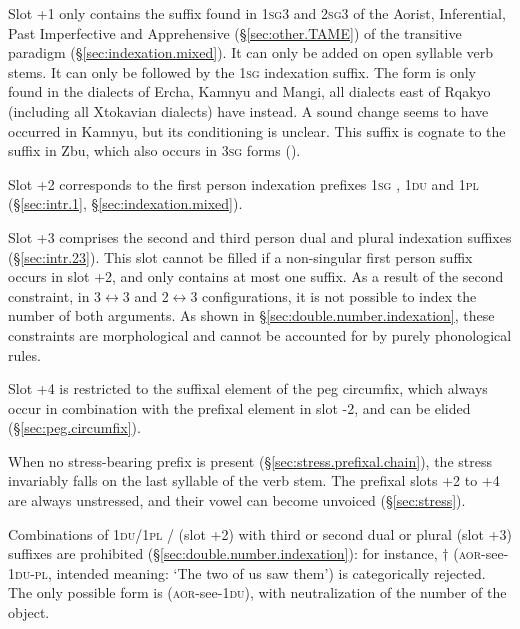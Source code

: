Slot +1 only contains the  suffix found in  \textsc{1sg}\fl{}3 and \textsc{2sg}\fl{}3 of the Aorist, Inferential, Past Imperfective and Apprehensive (§\ref{sec:other.TAME}) of the transitive paradigm (§\ref{sec:indexation.mixed}). It can only be added on open syllable verb stems. It can only be followed by the \textsc{1sg}  indexation suffix. The form  is only found in the dialects of Ercha, Kamnyu and Mangi, all dialects east of Rqakyo (including all Xtokavian dialects) have  instead. A sound change  \fl{}  seems to have occurred in Kamnyu, but its conditioning is unclear. This suffix is cognate to the suffix  in Zbu, which also occurs in \textsc{3sg}\flobv{} forms (\citealt[160--161]{gong18these}).

Slot +2 corresponds to the first person indexation prefixes \textsc{1sg} , \textsc{1du}  and \textsc{1pl}  (§\ref{sec:intr.1},  §\ref{sec:indexation.mixed}).

Slot +3 comprises the second and third person dual  and plural  indexation suffixes (§\ref{sec:intr.23}). This slot cannot be filled if a non-singular first person suffix occurs in slot +2, and only contains at most one suffix. As a result of the second constraint, in 3$\leftrightarrow$3 and 2$\leftrightarrow$3 configurations, it is not possible to index the number of both arguments. As shown in §\ref{sec:double.number.indexation}, these constraints are morphological and cannot be accounted for by purely phonological rules.

Slot +4 is restricted to the suffixal element  of the peg circumfix, which always occur in combination with the prefixal element  in slot -2, and can be elided (§\ref{sec:peg.circumfix}).

When no stress-bearing prefix is present (§\ref{sec:stress.prefixal.chain}), the stress invariably falls on the last syllable of the verb stem. The prefixal slots +2 to +4 are always unstressed, and their vowel can become unvoiced (§\ref{sec:stress}).

Combinations of \textsc{1du}/\textsc{1pl} / (slot +2) with third or second dual or plural  (slot +3) suffixes are prohibited (§\ref{sec:double.number.indexation}): for instance, $\dagger$ (\textsc{aor}-see-\textsc{1du}-\textsc{pl}, intended meaning: `The two of us saw them') is categorically rejected. The only possible form is  (\textsc{aor}-see-\textsc{1du}), with neutralization of the number of the object. 
 
